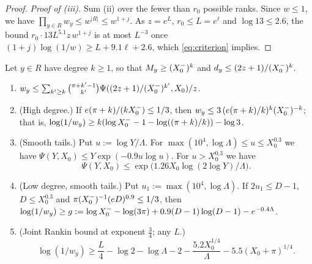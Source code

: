 \begin{proof}
\emph{Proof of (iii).} Sum (ii) over the fewer than $r_0$ possible ranks. Since $w\le1$, we have
$\prod_{y\in R}w_y\le w^{|R|}\le w^{1+j}$. As $z=e^L$, $r_0\le L=e^{\ell}$ and $\log13\le2.6$, the bound
$r_0\cdot13L^{5.1}z\,w^{1+j}$ is at most $L^{-3}$ once $(1+j)\log(1/w)\ge L+9.1\ell+2.6$, which \eqref{eq:criterion} implies.
\end{proof}

\begin{lemma}\label{lem:rowweights}
Let $y\in R$ have degree $k\ge1$, so that $M_y\ge(X_0^{-})^k$ and $d_y\le(2z+1)/(X_0^{-})^k$.
\begin{enumerate}[label=\textup{(\alph*)}]
\item $w_y\le\sum_{k'\ge k}\binom{\pi+k'-1}{k'}\Psi((2z+1)/(X_0^{-})^{k'},X_0)/z$.
\item (High degree.) If $e(\pi+k)/(kX_0^{-})\le1/3$, then $w_y\le3\,(e(\pi+k)/k)^k(X_0^{-})^{-k}$; that is,
  $\log(1/w_y)\ge k(\log X_0^{-}-1-\log((\pi+k)/k))-\log3$.
\item (Smooth tails.) Put $u:=\log Y/\Lambda$. For $\max(10^4,\log\Lambda)\le u\le X_0^{0.3}$ we have
  $\Psi(Y,X_0)\le Y\exp(-0.9u\log u)$. For $u>X_0^{0.3}$ we have
  \[\Psi(Y,X_0)\le\exp\big(1.26X_0\log(2\log Y)/\Lambda\big).\]
\item (Low degree, smooth tails.) Put $u_1:=\max(10^4,\log\Lambda)$. If $2u_1\le D-1$, $D\le X_0^{0.3}$ and
  $\pi(X_0^{-})^{-1}(eD)^{0.9}\le1/3$, then $\log(1/w_y)\ge g:=\log X_0^{-}-\log(3\pi)+0.9(D-1)\log(D-1)-e^{-0.4\Lambda}$.
\item (Joint Rankin bound at exponent $\tfrac34$; any $L$.)
  \[
  \log(1/w_y)\ge\frac L4-\log2-\log\Lambda-2-\frac{5.2X_0^{1/4}}{\Lambda}-5.5(X_0+\pi)^{1/4}.
  \]
\end{enumerate}
\end{lemma}

